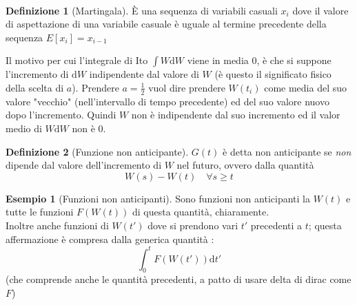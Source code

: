 \documentclass[a4paper,12pt]{article}
\theoremstyle{plain}
\theoremstyle{definition}
\newtheorem{defn}{Definizione}[section]
\newtheorem{exmp}{Esempio}[section]
\newcommand{\f}[2]{\frac{#1}{#2}}
\renewcommand{\d}{\text{d}}
\theoremstyle{remark}
\begin{document}
\\ \begin{defn}[Martingala]
È una sequenza di variabili casuali $x_i$ dove il valore di aspettazione di una variabile casuale è uguale al termine precedente della sequenza $E[x_i]=x_{i-1}$ 
\end{defn}
Il motivo per cui l'integrale di Ito $\int W\d W$ viene in media 0, è che si suppone l'incremento di $\d W$ indipendente dal valore di $W$ (è questo il significato fisico della scelta di $a$). Prendere $a=\f{1}{2}$ vuol dire prendere $W(t_i)$ come media del suo valore "vecchio" (nell'intervallo di tempo precedente) ed del suo valore nuovo dopo l'incremento. Quindi $W$ non è indipendente dal suo incremento ed il valor medio di $W\d W$ non è 0. 
\begin{defn}[Funzione non anticipante]
$G(t)$ è detta non anticipante se \emph{non} dipende dal valore dell'incremento di $W$ nel futuro, ovvero dalla quantità
\[W(s)-W(t)\quad	\forall s\ge t	\]
\end{defn}
\begin{exmp}[Funzioni non anticipanti]
Sono funzioni non anticipanti la $W(t)$ e tutte le funzioni $F(W(t))$ di questa quantità, chiaramente. \\Inoltre anche funzioni di $W(t')$ dove si prendono vari $t'$ precedenti a $t$; questa affermazione è compresa dalla generica quantità :
\[	\int^t_{0} F(W(t'))\d t' 	\]
(che comprende anche le quantità precedenti, a patto di usare delta di dirac come $F$)

\end{exmp}
\end{document}
